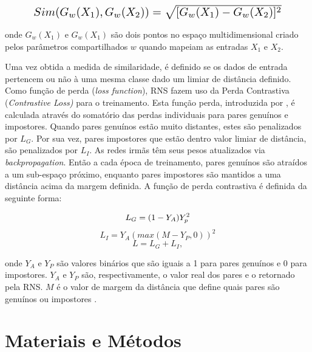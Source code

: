 \documentclass[conference,harvard,brazil,english]{sbatex}
\begin{document}
\begin{equation}
\resizebox{.85\hsize}{!}{$Sim(G_w(X_1), G_w(X_2)) =  \sqrt{[G_w(X_1) - G_w(X_2)]^2}$}
\end{equation}

\noindent onde $G_w(X_1)$ e $G_w(X_1)$ são dois pontos no espaço multidimensional criado pelos parâmetros compartilhados $w$ quando mapeiam as entradas $X_1$ e $X_2$.

Uma vez obtida a medida de similaridade, é definido se os dados de entrada pertencem ou não à uma mesma classe dado um limiar de distância definido. Como função de perda (\textit{loss function}), RNS fazem uso da Perda Contrastiva (\textit{Contrastive Loss)} para o treinamento. Esta função perda, introduzida por \cite{Chopra2005}, é calculada através do somatório das perdas individuais para pares genuínos e impostores. Quando pares genuínos estão muito distantes, estes são penalizados por $L_G$. Por sua vez, pares impostores que estão dentro valor limiar de distância, são penalizados por $L_I$. As redes irmãs têm seus pesos atualizados via \textit{backpropagation}. Então a cada época de treinamento, pares genuínos são atraídos a um sub-espaço próximo, enquanto pares impostores são mantidos a uma distância acima da margem definida. A função de perda contrastiva é definida da seguinte forma:

\begin{equation*}
    L_G = (1 - Y_A)Y_p^2\\
\end{equation*}
\begin{equation}
    L_I  = Y_A(max(M-Y_P,0))^2
\end{equation}
\begin{equation*}
    L =L_G + L_I,
\end{equation*}

\noindent onde $Y_A$ e $Y_P$ são valores binários que são iguais a 1 para pares genuínos e 0 para impostores. $Y_A$ e $Y_P$ são, respectivamente, o valor real dos pares e o retornado pela RNS. $M$ é o valor de margem da distância que define quais pares são genuínos ou impostores \cite{Martin2017}.


   
\section{Materiais e Métodos}\label{sec:met}
\end{document}
